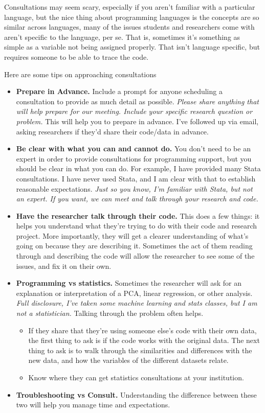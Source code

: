 \documentclass[
]{book}
\providecommand{\tightlist}{%
  \setlength{\itemsep}{0pt}\setlength{\parskip}{0pt}}
\begin{document}
Consultations may seem scary, especially if you aren't familiar with a particular language, but the nice thing about programming languages is the concepts are so similar across languages, many of the issues students and researchers come with aren't specific to the language, per se. That is, sometimes it's something as simple as a variable not being assigned properly. That isn't language specific, but requires someone to be able to trace the code.

Here are some tips on approaching consultations

\begin{itemize}
\tightlist
\item
  \textbf{Prepare in Advance.} Include a prompt for anyone scheduling a consultation to provide as much detail as possible. \emph{Please share anything that will help prepare for our meeting. Include your specific research question or problem.} This will help you to prepare in advance. I've followed up via email, asking researchers if they'd share their code/data in advance.
\item
  \textbf{Be clear with what you can and cannot do.} You don't need to be an expert
  in order to provide consultations for programming support, but you should be
  clear in what you can do. For example, I have provided many Stata
  consultations. I have never used Stata, and I am clear with that to establish
  reasonable expectations. \emph{Just so you know, I'm familiar with Stata, but not an
  expert. If you want, we can meet and talk through your research and code.}
\item
  \textbf{Have the researcher talk through their code.} This does a few things: it
  helps you understand what they're trying to do with their code and research
  project. More importantly, they will get a clearer understanding of what's going
  on because they are describing it. Sometimes the act of them reading through
  and describing the code will allow the researcher to see some of the issues,
  and fix it on their own.
\item
  \textbf{Programming vs statistics.} Sometimes the researcher will ask for an
  explanation or interpretation of a PCA, linear regression, or other analysis.
  \emph{Full disclosure, I've taken some machine learning and stats classes, but I am
  not a statistician.} Talking through the problem often helps.

  \begin{itemize}
  \tightlist
  \item
    If they share that they're using someone else's code with their own data,
    the first thing to ask is if the code works with the original data. The next
    thing to ask is to walk through the similarities and differences
    with the new data, and how the variables of the different datasets relate.
  \item
    Know where they can get statistics consultations at your institution.
  \end{itemize}
\item
  \textbf{Troubleshooting vs Consult.} Understanding the difference between these two
  will help you manage time and expectations.


\end{itemize}
\end{document}
